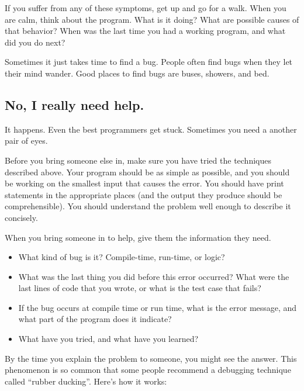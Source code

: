 \documentclass[12pt]{book}
\theoremstyle{exercise}
\begin{document}
If you suffer from any of these symptoms, get up and go for a walk.
When you are calm, think about the program.
What is it doing?
What are possible causes of that behavior?
When was the last time you had a working program, and what did you do next?

Sometimes it just takes time to find a bug.
People often find bugs when they let their mind wander.
Good places to find bugs are buses, showers, and bed.


\subsection*{No, I really need help.}

It happens.
Even the best programmers get stuck.
Sometimes you need a another pair of eyes.

Before you bring someone else in, make sure you have tried the techniques described above.
Your program should be as simple as possible, and you should be working on the smallest input that causes the error.
You should have print statements in the appropriate places (and the output they produce should be comprehensible).
You should understand the problem well enough to describe it concisely.

When you bring someone in to help, give them the information they need.

\begin{itemize}

\item What kind of bug is it?
Compile-time, run-time, or logic?

\item What was the last thing you did before this error occurred?
What were the last lines of code that you wrote, or what is the test case that fails?

\item If the bug occurs at compile time or run time, what is the error message, and what part of the program does it indicate?

\item What have you tried, and what have you learned?

\end{itemize}

By the time you explain the problem to someone, you might see the answer.
This phenomenon is so common that some people recommend a debugging technique called ``rubber ducking''.
Here's how it works:
\end{document}
